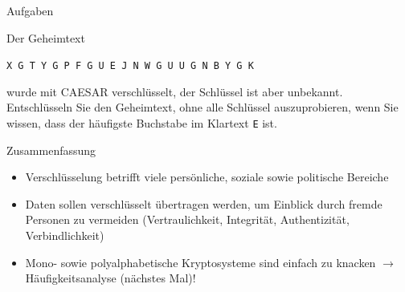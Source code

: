 %
%
%
%
%

\begin{frame}[label=aufgaben]{Aufgaben}
\begin{myexercise}
 Der Geheimtext
 \begin{center}
   \texttt{X G T Y G P F G U E J N W G U U G N B Y G K}
 \end{center}
 wurde mit CAESAR verschlüsselt, der Schlüssel ist aber unbekannt.
 Entschlüsseln Sie den Geheimtext, ohne alle Schlüssel auszuprobieren, wenn Sie wissen, dass der häufigste Buchstabe im Klartext \texttt{E} ist.
\end{myexercise}
\end{frame}

\begin{frame}[label=summary]{Zusammenfassung}
\begin{itemize}[<+->]
    \item Verschlüsselung betrifft viele persönliche, soziale sowie politische Bereiche
    \item Daten sollen verschlüsselt übertragen werden, um Einblick durch fremde Personen zu vermeiden (Vertraulichkeit, Integrität, Authentizität, Verbindlichkeit)
    \item Mono- sowie polyalphabetische Kryptosysteme sind einfach zu knacken $\rightarrow$ Häufigkeitsanalyse (nächstes Mal)!
\end{itemize}
\end{frame}
